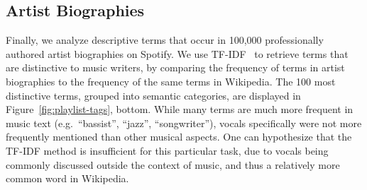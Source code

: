 \documentclass{article}
\newcommand {\ad}[1]{{\color{blue}{[{#1}]}}}
\newcommand {\rmb}[1]{{\color{red}{[{#1}]}}}
\begin{document}



\subsection{Artist Biographies}

Finally, we analyze descriptive terms that occur in 100,000 professionally authored artist biographies on Spotify.
We use TF-IDF~\cite{sparck1972statistical} to retrieve terms that are distinctive to music writers, by comparing the frequency of terms in artist biographies to the frequency of the same terms in Wikipedia.
The 100 most distinctive terms, grouped into semantic categories, are displayed in Figure~\ref{fig:playlist-tags}, bottom.
While many terms are much more frequent in music text (e.g.~``bassist'', ``jazz'', ``songwriter''), vocals specifically were not more frequently mentioned than other musical aspects.
One can hypothesize that the TF-IDF method is insufficient for this particular task, due to vocals being commonly discussed outside the context of music, and thus a relatively more common word in Wikipedia.
\end{document}
